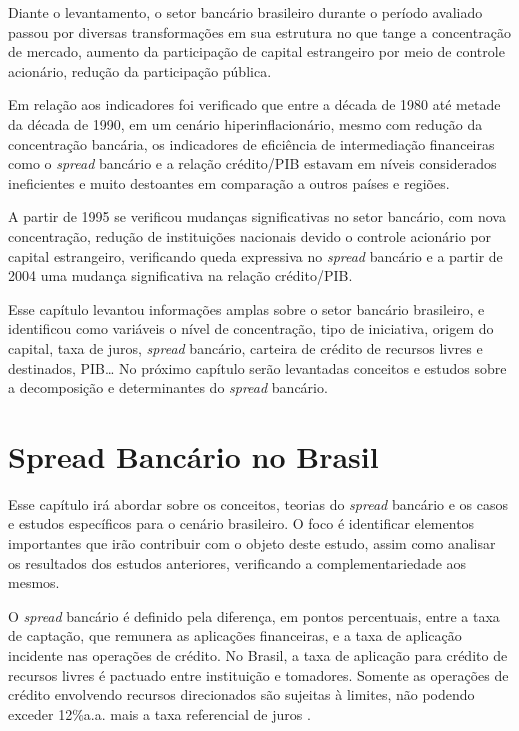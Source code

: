 \documentclass[12pt,openright,oneside,a4paper,chapter=TITLE,section=TITLE,subsection=Title,english,french,spanish,portugues,sumario=tradicional]{04-class-files/abntex2}
\begin{document}
\label{fig:spread2019}

Diante o levantamento, o setor bancário brasileiro durante o período avaliado passou por diversas transformações em sua estrutura no que tange a concentração de mercado, aumento da participação de capital estrangeiro por meio de controle acionário, redução da participação pública.

Em relação aos indicadores foi verificado que entre a década de 1980 até metade da década de 1990, em um cenário hiperinflacionário, mesmo com redução da concentração bancária, os indicadores de eficiência de intermediação financeiras como o \emph{spread} bancário e a relação crédito/PIB estavam em níveis considerados ineficientes e muito destoantes em comparação a outros países e regiões.

A partir de 1995 se verificou mudanças significativas no setor bancário, com nova concentração, redução de instituições nacionais devido o controle acionário por capital estrangeiro, verificando queda expressiva no \emph{spread} bancário e a partir de 2004 uma mudança significativa na relação crédito/PIB.

Esse capítulo levantou informações amplas sobre o setor bancário brasileiro, e identificou como variáveis o nível de concentração, tipo de iniciativa, origem do capital, taxa de juros, \emph{spread} bancário, carteira de crédito de recursos livres e destinados, PIB\ldots{} No próximo capítulo serão levantadas conceitos e estudos sobre a decomposição e determinantes do \emph{spread} bancário.

\textual

\pagestyle{simple}

\chapter{Spread Bancário no Brasil}

Esse capítulo irá abordar sobre os conceitos, teorias do \emph{spread} bancário e os casos e estudos específicos para o cenário brasileiro. O foco é identificar elementos importantes que irão contribuir com o objeto deste estudo, assim como analisar os resultados dos estudos anteriores, verificando a complementariedade aos mesmos.

O \emph{spread} bancário é definido pela diferença, em pontos percentuais, entre a taxa de captação, que remunera as aplicações financeiras, e a taxa de aplicação incidente nas operações de crédito. No Brasil, a taxa de aplicação para crédito de recursos livres é pactuado entre instituição e tomadores. Somente as operações de crédito envolvendo recursos direcionados são sujeitas à limites, não podendo exceder 12\%a.a. mais a taxa referencial de juros \cite{BCB:2000}.
\end{document}
